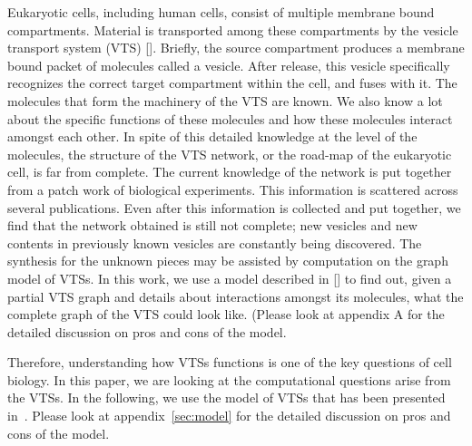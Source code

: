 
Eukaryotic cells, including human cells, consist of multiple membrane bound compartments.
Material is transported among these compartments by the vesicle transport system (VTS) []. Briefly,
the source compartment produces a membrane bound packet of molecules called a vesicle. After
release, this vesicle specifically recognizes the correct target compartment within the cell, and fuses
with it. The molecules that form the machinery of the VTS are known. We also know a lot about the
specific functions of these molecules and how these molecules interact amongst each other. In spite
of this detailed knowledge at the level of the molecules, the structure of the VTS network, or the
road-map of the eukaryotic cell, is far from complete. The current knowledge of the network is put
together from a patch work of biological experiments. This information is scattered across several
publications. Even after this information is collected and put together, we find that the network
obtained is still not complete; new vesicles and new contents in previously known vesicles are
constantly being discovered. The synthesis for the unknown pieces may be assisted by computation
on the graph model of VTSs. 
% 
In this work, we use a model described in [] to find out, given a partial
VTS graph and details about interactions amongst its molecules, what the complete graph of the
VTS could look like. (Please look at appendix A for the detailed discussion on pros and cons of the
model.
%
%
%

%
Therefore, understanding how VTSs functions is one of the key
questions of cell biology.
%
In this paper, we are looking at the computational questions 
arise from the VTSs.
%
In the following, we use the model of VTSs that has been presented
in~\cite{VTS}.
%
Please look at appendix~\ref{sec:model}
for the detailed discussion on pros and cons of the model.


